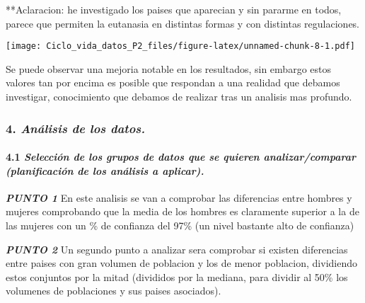 \documentclass[]{article}
\newenvironment{Shaded}{\begin{snugshade}}{\end{snugshade}}
\newcommand{\KeywordTok}[1]{\textcolor[rgb]{0.13,0.29,0.53}{\textbf{#1}}}
\newcommand{\StringTok}[1]{\textcolor[rgb]{0.31,0.60,0.02}{#1}}
\newcommand{\OperatorTok}[1]{\textcolor[rgb]{0.81,0.36,0.00}{\textbf{#1}}}
\newcommand{\NormalTok}[1]{#1}
\let\oldparagraph\paragraph
\renewcommand{\paragraph}[1]{\oldparagraph{#1}\mbox{}}
\begin{document}
**Aclaracion: he investigado los paises que aparecian y sin pararme en
todos, parece que permiten la eutanasia en distintas formas y con
distintas regulaciones.

\begin{Shaded}
\end{Shaded}

\texttt{[image: Ciclo\_vida\_datos\_P2\_files/figure-latex/unnamed-chunk-8-1.pdf]}

Se puede observar una mejoria notable en los resultados, sin embargo
estos valores tan por encima es posible que respondan a una realidad que
debamos investigar, conocimiento que debamos de realizar tras un
analisis mas profundo.

\subsubsection{\texorpdfstring{4. \emph{Análisis de los
datos.}}{4. Análisis de los datos.}}\label{analisis-de-los-datos.}

\paragraph{\texorpdfstring{4.1 \emph{Selección de los grupos de datos
que se quieren analizar/comparar (planificación de los análisis a
aplicar).}}{4.1 Selección de los grupos de datos que se quieren analizar/comparar (planificación de los análisis a aplicar).}}\label{seleccion-de-los-grupos-de-datos-que-se-quieren-analizarcomparar-planificacion-de-los-analisis-a-aplicar.}

\textbf{\emph{PUNTO 1}} En este analisis se van a comprobar las
diferencias entre hombres y mujeres comprobando que la media de los
hombres es claramente superior a la de las mujeres con un \% de
confianza del 97\% (un nivel bastante alto de confianza)

\textbf{\emph{PUNTO 2}} Un segundo punto a analizar sera comprobar si
existen diferencias entre paises con gran volumen de poblacion y los de
menor poblacion, dividiendo estos conjuntos por la mitad (divididos por
la mediana, para dividir al 50\% los volumenes de poblaciones y sus
paises asociados).
\end{document}
